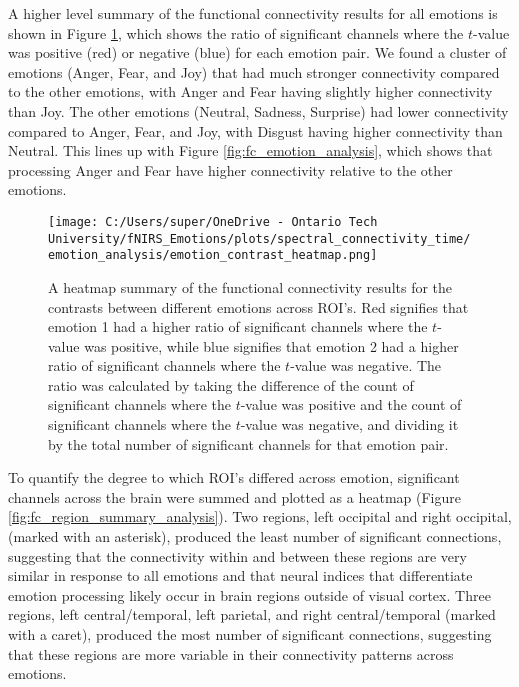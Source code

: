 A higher level summary of the functional connectivity results for all emotions is shown in Figure \ref{fig:fc_emotion_summary_analysis}, which shows the ratio of significant channels where the $t$-value was positive (red) or negative (blue) for each emotion pair.
We found a cluster of emotions (Anger, Fear, and Joy) that had much stronger connectivity compared to the other emotions, with Anger and Fear having slightly higher connectivity than Joy.
The other emotions (Neutral, Sadness, Surprise) had lower connectivity compared to Anger, Fear, and Joy, with Disgust having higher connectivity than Neutral. 
This lines up with Figure \ref{fig:fc_emotion_analysis}, which shows that processing Anger and Fear have higher connectivity relative to the other emotions. 

\begin{figure}[H]
  \centering
  \texttt{[image: C:/Users/super/OneDrive - Ontario Tech University/fNIRS\_Emotions/plots/spectral\_connectivity\_time/emotion\_analysis/emotion\_contrast\_heatmap.png]}
  \caption[FC: Summary of Contrasts by Emotion Pair]{A heatmap summary of the functional connectivity results for the contrasts between different emotions across ROI's. 
  Red signifies that emotion 1 had a higher ratio of significant channels where the $t$-value was positive, while blue signifies that emotion 2 had a higher ratio of significant channels where the $t$-value was negative.
  The ratio was calculated by taking the difference of the count of significant channels where the $t$-value was positive and the count of significant channels where the $t$-value was negative, and dividing it by the total number of significant channels for that emotion pair.}
  \label{fig:fc_emotion_summary_analysis}
\end{figure}

To quantify the degree to which ROI's differed across emotion, significant channels across the brain were summed and plotted as a heatmap (Figure \ref{fig:fc_region_summary_analysis}).
Two regions, left occipital and right occipital, (marked with an asterisk), produced the least number of significant connections, suggesting that the connectivity within and between these regions are very similar in response to all emotions and that neural indices that differentiate emotion processing likely occur in brain regions outside of visual cortex.  
Three regions, left central/temporal, left parietal, and right central/temporal (marked with a caret), produced the most number of significant connections, suggesting that these regions are more variable in their connectivity patterns across emotions.

